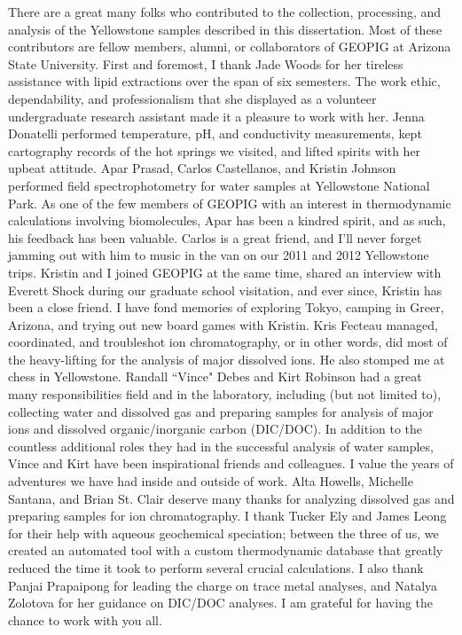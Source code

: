 There are a great many folks who contributed to the collection, processing, and analysis of the Yellowstone samples described in this dissertation. Most of these contributors are fellow members, alumni, or collaborators of GEOPIG at Arizona State University. First and foremost, I thank Jade Woods for her tireless assistance with lipid extractions over the span of six semesters. The work ethic, dependability, and professionalism that she displayed as a volunteer undergraduate research assistant made it a pleasure to work with her. Jenna Donatelli performed temperature, pH, and conductivity measurements, kept cartography records of the hot springs we visited, and lifted spirits with her upbeat attitude. Apar Prasad, Carlos Castellanos, and Kristin Johnson performed field spectrophotometry for water samples at Yellowstone National Park. As one of the few members of GEOPIG with an interest in thermodynamic calculations involving biomolecules, Apar has been a kindred spirit, and as such, his feedback has been valuable. Carlos is a great friend, and I'll never forget jamming out with him to music in the van on our 2011 and 2012 Yellowstone trips. Kristin and I joined GEOPIG at the same time, shared an interview with Everett Shock during our graduate school visitation, and ever since, Kristin has been a close friend. I have fond memories of exploring Tokyo, camping in Greer, Arizona, and trying out new board games with Kristin. Kris Fecteau managed, coordinated, and troubleshot ion chromatography, or in other words, did most of the heavy-lifting for the analysis of major dissolved ions. He also stomped me at chess in Yellowstone. Randall ``Vince" Debes and Kirt Robinson had a great many responsibilities field and in the laboratory, including (but not limited to), collecting water and dissolved gas and preparing samples for analysis of major ions and dissolved organic/inorganic carbon (DIC/DOC). In addition to the countless additional roles they had in the successful analysis of water samples, Vince and Kirt have been inspirational friends and colleagues. I value the years of adventures we have had inside and outside of work. Alta Howells, Michelle Santana, and Brian St. Clair deserve many thanks for analyzing dissolved gas and preparing samples for ion chromatography. I thank Tucker Ely and James Leong for their help with aqueous geochemical speciation; between the three of us, we created an automated tool with a custom thermodynamic database that greatly reduced the time it took to perform several crucial calculations. I also thank Panjai Prapaipong for leading the charge on trace metal analyses, and Natalya Zolotova for her guidance on DIC/DOC analyses. I am grateful for having the chance to work with you all.


